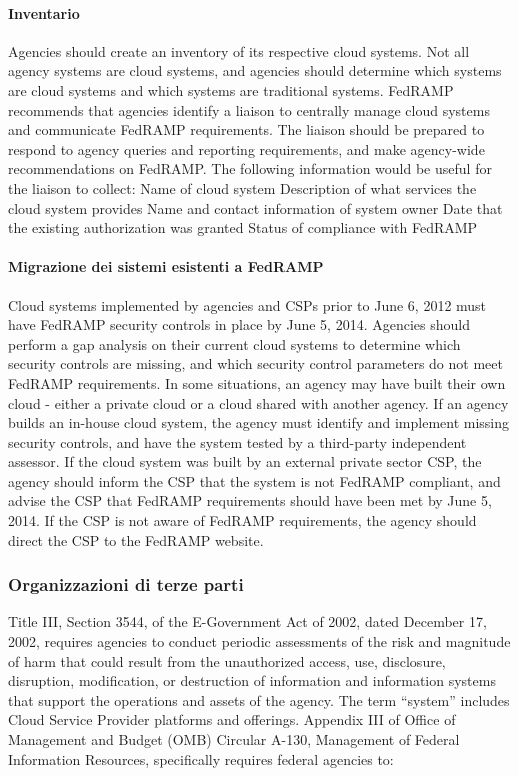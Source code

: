 \documentclass[../main.tex]{subfiles}
\begin{document}
\paragraph {Inventario}
Agencies should create an inventory of its respective cloud systems.  Not all agency systems are cloud systems, and agencies should determine which systems are cloud systems and which systems are traditional systems.  
FedRAMP recommends that agencies identify a liaison to centrally manage cloud systems and communicate FedRAMP requirements.  The liaison should be prepared to respond to agency queries and reporting requirements, and make agency-wide recommendations on FedRAMP.  The following information would be useful for the liaison to collect:
Name of cloud system
Description of what services the cloud system provides
Name and contact information of system owner
Date that the existing authorization was granted
Status of compliance with FedRAMP

\paragraph {Migrazione dei sistemi esistenti a FedRAMP}
Cloud systems implemented by agencies and CSPs prior to June 6, 2012 must have FedRAMP security controls in place by June 5, 2014.  Agencies should perform a gap analysis on their current cloud systems to determine which security controls are missing, and which security control parameters do not meet FedRAMP requirements.  
In some situations, an agency may have built their own cloud - either a private cloud or a cloud shared with another agency.  If an agency builds an in-house  cloud system, the agency must identify and implement missing security controls, and have the system tested by a third-party independent assessor.
If the cloud system was built by an external private sector CSP, the agency should inform the CSP that the system is not FedRAMP compliant, and advise the CSP that FedRAMP requirements should have been met by June 5, 2014.  If the CSP is not aware of FedRAMP requirements, the agency should direct the CSP to the FedRAMP website.  


\subsubsection{Organizzazioni di terze parti}

Title III, Section 3544, of the E-Government Act of 2002, dated December 17, 2002, requires agencies to conduct periodic assessments of the risk and magnitude of harm that could result from the unauthorized access, use, disclosure, disruption, modification, or destruction of information and information systems that support the operations and assets of the agency.  The term “system” includes Cloud Service Provider platforms and offerings.  Appendix III of Office of Management and Budget (OMB) Circular A-130, Management of Federal Information Resources, specifically requires federal agencies to:
\end{document}
